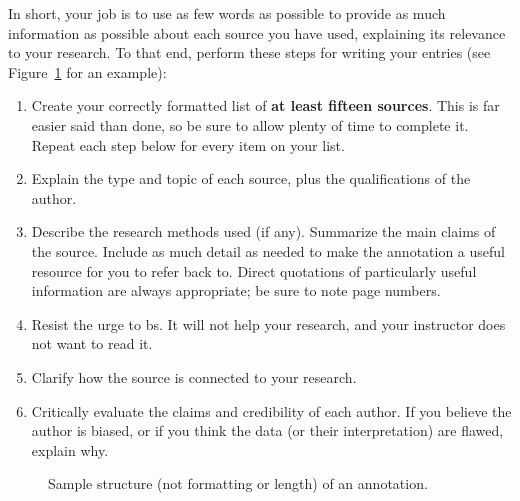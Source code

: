 \documentclass[11pt, oneside]{amsart}	%
\begin{document}
In short, your job is to use as few words as possible to provide as much information as possible about each source you have used, explaining its relevance to your research. To that end, perform these steps for writing your entries (see Figure~\ref{fig:sample-annotation-content} for an example):
\begin{enumerate}
	\item Create your correctly formatted list of \textbf{at least fifteen sources}. This is far easier said than done, so be sure to allow plenty of time to complete it. Repeat each step below for every item on your list.
	\item  Explain\label{step:source-id} the type and topic of each source, plus the qualifications of the author.
	\item  Describe the research methods used (if any). Summarize the main claims of the source. Include as much detail as needed to make the annotation a useful resource for you to refer back to. Direct quotations of particularly useful information are always appropriate; be sure to note page numbers.
	\item  Resist the urge to bs. It will not help your research, and your instructor does not want to read it.
	\item  Clarify how the source is connected to your research.
	\item  Critically evaluate the claims and credibility of each author. If you believe the author is biased, or if you think the data (or their interpretation) are flawed, explain why.
\end{enumerate}


\begin{figure}[ht]	
	\centering
	\caption{Sample structure (not formatting or length) of an annotation.}
\label{fig:sample-annotation-content}
\end{figure} %
\end{document}

